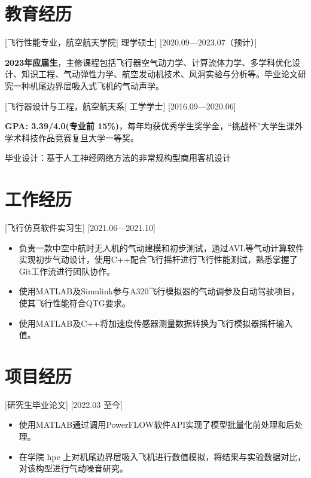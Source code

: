 \documentclass{resume}
\begin{document}

\ResumeTitle

\section{教育经历}
[\textnormal{飞行性能专业，航空航天学院|} 理学硕士]
[2020.09—2023.07（预计）]

\textbf{2023年应届生}，主修课程包括飞行器空气动力学、计算流体力学、多学科优化设计、知识工程、气动弹性力学、航空发动机技术、风洞实验与分析等。毕业论文研究一种机尾边界层吸入式飞机的气动声学。

[\textnormal{飞行器设计与工程，航空航天系|} 工学学士]
[2016.09—2020.06]

\textbf{GPA: 3.39/4.0(专业前 15\%)}，每年均获优秀学生奖学金，“挑战杯”大学生课外学术科技作品竞赛复旦大学一等奖。

毕业设计：基于人工神经网络方法的非常规构型商用客机设计

\section{工作经历}

[飞行仿真软件实习生]
[2021.06—2021.10] 

\begin{itemize}
  \item 负责一款中空中航时无人机的气动建模和初步测试，通过AVL等气动计算软件实现初步气动设计，使用C++配合飞行摇杆进行飞行性能测试，熟悉掌握了Git工作流进行团队协作。
  \item 使用MATLAB及Simulink参与A320飞行模拟器的气动调参及自动驾驶项目，使其飞行性能符合QTG要求。
  \item 使用MATLAB及C++将加速度传感器测量数据转换为飞行模拟器摇杆输入值。
\end{itemize}

\section{项目经历}

[研究生毕业论文]
[2022.03 至今]
\begin{itemize}
  \item 使用MATLAB通过调用PowerFLOW软件API实现了模型批量化前处理和后处理。
  \item 在学院 hpc 上对机尾边界层吸入飞机进行数值模拟，将结果与实验数据对比，对该构型进行气动噪音研究。
\end{itemize}
\end{document}
